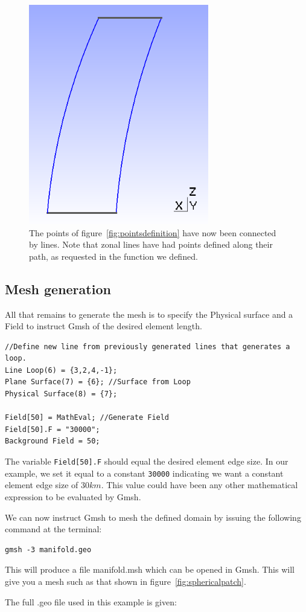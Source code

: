 \begin{figure}[htbp]
 \centering
  \includegraphics[width=0.7\textwidth]{../figures/linesdefinition}
  \caption{The points of figure~\ref{fig:pointsdefinition} have now been connected by lines. Note that zonal lines have had points defined along their path, as requested in the function we defined.}
  \label{fig:linesdefinition}
\end{figure}


\subsection{Mesh generation}
\label{sect:meshgenerationmanifold}
All that remains to generate the mesh is to specify the Physical surface and a Field to instruct Gmsh of the desired element length.

\begin{lstlisting}
//Define new line from previously generated lines that generates a loop.
Line Loop(6) = {3,2,4,-1};
Plane Surface(7) = {6}; //Surface from Loop
Physical Surface(8) = {7};

Field[50] = MathEval; //Generate Field
Field[50].F = "30000";
Background Field = 50;
\end{lstlisting}

The variable \lstinline{Field[50].F} should equal the desired element edge size. In our example, we set it equal to a constant \lstinline{30000} indicating we want a constant element edge size of $30km$. This value could have been any other mathematical expression to be evaluated by Gmsh.

We can now instruct Gmsh to mesh the defined domain by issuing the following command at the terminal:
\begin{lstlisting}
gmsh -3 manifold.geo
\end{lstlisting}
This will produce a file manifold.msh which can be opened in Gmsh. This will give you a mesh such as that shown in figure~\ref{fig:sphericalpatch}.

The full .geo file used in this example is given:


